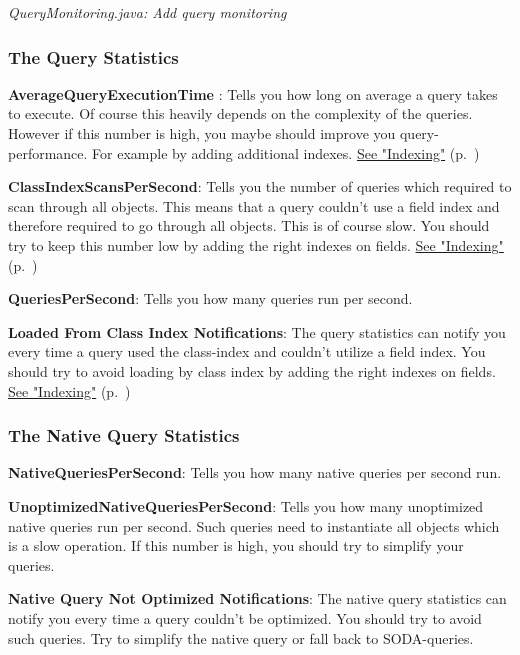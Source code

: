{\small\itshape QueryMonitoring.java: Add query monitoring\par}
\medskip

\subsubsection*{The Query Statistics}

\textbf{AverageQueryExecutionTime} : Tells you how long on average a query takes to execute. Of course this heavily depends on the complexity of the queries. However if this number is high, you maybe should improve you query-performance. For example by adding additional indexes. \hyperref[ref:basics-indexing]{See "Indexing"} (p.~\pageref{ref:basics-indexing})

\textbf{ClassIndexScansPerSecond}: Tells you the number of queries which required to scan through all objects. This means that a query couldn't use a field index and therefore required to go through all objects. This is of course slow. You should try to keep this number low by adding the right indexes on fields. \hyperref[ref:basics-indexing]{See "Indexing"} (p.~\pageref{ref:basics-indexing})

\textbf{QueriesPerSecond}: Tells you how many queries run per second.

\textbf{Loaded From Class Index Notifications}: The query statistics can notify you every time a query used the class-index and couldn't utilize a field index. You should try to avoid loading by class index by adding the right indexes on fields. \hyperref[ref:basics-indexing]{See "Indexing"} (p.~\pageref{ref:basics-indexing})

\subsubsection*{The Native Query Statistics}

\textbf{NativeQueriesPerSecond}: Tells you how many native queries per second run.

\textbf{UnoptimizedNativeQueriesPerSecond}: Tells you how many unoptimized native queries run per second. Such queries need to instantiate all objects which is a slow operation. If this number is high, you should try to simplify your queries.

\textbf{Native Query Not Optimized Notifications}: The native query statistics can notify you every time a query couldn't be optimized. You should try to avoid such queries. Try to simplify the native query or fall back to SODA-queries.

